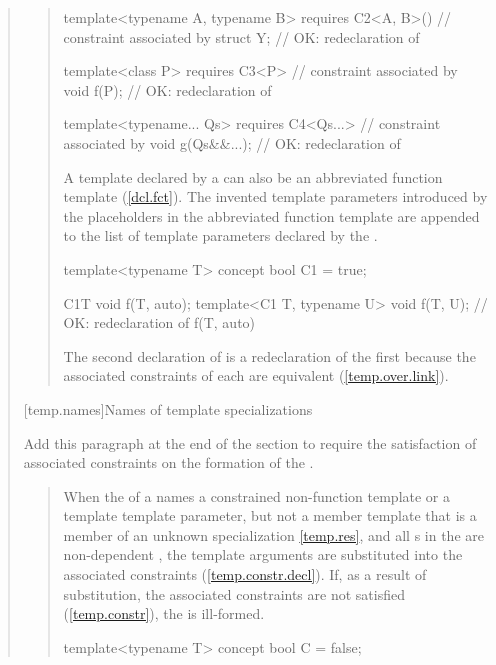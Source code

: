 \begin{quote}
\begin{quote}
\begin{codeblock}
template<typename A, typename B> 
  requires C2<A, B>()  // constraint associated by 
    struct Y;          // OK: redeclaration of 

template<class P>
  requires C3<P> // constraint associated by 
    void f(P);   // OK: redeclaration of 

template<typename... Qs>
  requires C4<Qs...> // constraint associated by 
    void g(Qs&&...); // OK: redeclaration of 
\end{codeblock}
\exitexample


\pnum
A template declared by a  can also be 
an abbreviated function template (\ref{dcl.fct}). 
% 
The invented template parameters introduced by the placeholders in the 
abbreviated function template are appended to the list of template parameters 
declared by the .
% 
\enterexample
\begin{codeblock}
template<typename T> concept bool C1 = true;

C1{T} void f(T, auto);
template<C1 T, typename U> void f(T, U); // OK: redeclaration of f(T, auto)
\end{codeblock}
% 
\enternote
The second declaration of  is a redeclaration of the first
because the associated constraints of each are equivalent 
(\ref{temp.over.link}).
\exitnote
\exitexample

\end{quote}

[temp.names]{Names of template specializations}

Add this paragraph at the end of the section to require the satisfaction of 
associated constraints on the formation of the .

\begin{quote}
\setcounter{Paras}{7}
\pnum
When the  of a  names
a constrained non-function template or a template template parameter,
but not a member template that is a member of an unknown specialization
\ref{temp.res}, and all s in the
 are non-dependent , the 
template arguments are substituted into the associated constraints
(\ref{temp.constr.decl}). 
% 
If, as a result of substitution, the associated constraints are not 
satisfied (\ref{temp.constr}), the  is ill-formed.
% 
\enterexample
\begin{codeblock}
template<typename T> concept bool C = false;


\end{codeblock}
\end{quote}
\end{quote}
